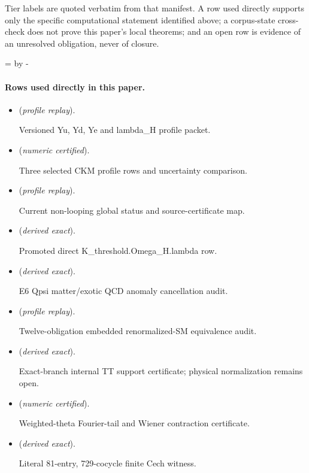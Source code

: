 \documentclass[11pt,openany]{book}
\begin{document}
Tier labels are quoted verbatim from that manifest. A row used directly supports only the specific computational statement identified above; a corpus-state cross-check does not prove this paper's local theorems; and an open row is evidence of an unresolved obligation, never of closure.

\par\begingroup{}=\pagegoal\advance{} by -\pagetotal\ifdim\dimen0<7\baselineskip\newpage\fi\endgroup
\paragraph{Rows used directly in this paper.}
\begin{itemize}
\setlength{\itemsep}{0.25em}
\item {} (\emph{profile replay}).\par Versioned Yu, Yd, Ye and lambda\_H profile packet.
\item {} (\emph{numeric certified}).\par Three selected CKM profile rows and uncertainty comparison.
\item {} (\emph{profile replay}).\par Current non-looping global status and source-certificate map.
\item {} (\emph{derived exact}).\par Promoted direct K\_threshold.Omega\_H.lambda row.
\item {} (\emph{derived exact}).\par E6 Qpsi matter/exotic QCD anomaly cancellation audit.
\item {} (\emph{profile replay}).\par Twelve-obligation embedded renormalized-SM equivalence audit.
\item {} (\emph{derived exact}).\par Exact-branch internal TT support certificate; physical normalization remains open.
\item {} (\emph{numeric certified}).\par Weighted-theta Fourier-tail and Wiener contraction certificate.
\item {} (\emph{derived exact}).\par Literal 81-entry, 729-cocycle finite Cech witness.

\end{itemize}
\end{document}

